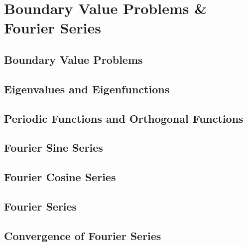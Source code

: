 \documentclass[../satmath.tex]{subfiles}
\begin{document}
\chapter{Boundary Value Problems \& Fourier Series}
\section{Boundary Value Problems}
\section{Eigenvalues and Eigenfunctions}
\section{Periodic Functions and Orthogonal Functions}
\section{Fourier Sine Series}
\section{Fourier Cosine Series}
\section{Fourier Series}
\section{Convergence of Fourier Series}
\end{document}
